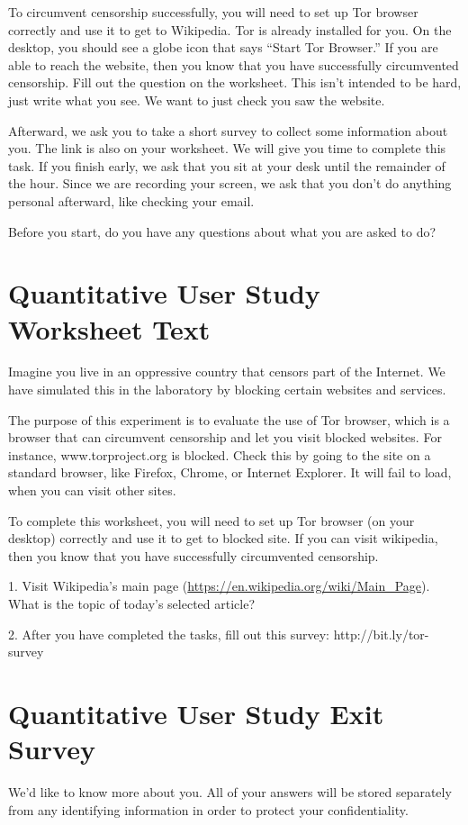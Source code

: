 \documentclass[USenglish,oneside,twocolumn]{article}
\begin{document}
To circumvent censorship successfully, you will need to set up Tor browser correctly and use it to get to Wikipedia. Tor is already installed for you. On the desktop, you should see a globe icon that says ``Start Tor Browser.'' If you are able to reach the website, then you know that you have successfully circumvented censorship. Fill out the question on the worksheet. This isn't intended to be hard, just write what you see. We want to just check you saw the website. 

Afterward, we ask you to take a short survey to collect some information about you. The link is also on your worksheet.
We will give you time to complete this task. If you finish early, we ask that you sit at your desk until the remainder of the hour. Since we are recording your screen, we ask that you don't do anything personal afterward, like checking your email.

Before you start, do you have any questions about what you are asked to do? 

\section{Quantitative User Study Worksheet Text} 
\label{summative-worksheet}
Imagine you live in an oppressive country that censors part of the Internet. We have simulated this in the laboratory by blocking certain websites and services.

The purpose of this experiment is to evaluate the use of Tor browser, which is a browser that can circumvent censorship and let you visit blocked websites. For instance, www.torproject.org is blocked. Check this by going to the site on a standard browser, like Firefox, Chrome, or Internet Explorer. It will fail to load, when you can visit other sites.

To complete this worksheet, you will need to set up Tor browser (on your desktop) correctly and use it to get to blocked site. If you can visit wikipedia, then you know that you have successfully circumvented censorship.

1. Visit Wikipedia’s main page (\url{https://en.wikipedia.org/wiki/Main\_Page}). What is the topic of today’s selected article? 

2. After you have completed the tasks, fill out this survey: http://bit.ly/tor-survey 


\section{Quantitative User Study Exit Survey} 
\label{quantitative-exit-survey}
We'd like to know more about you.  All of your answers will be stored separately from any identifying information in order to protect your confidentiality.
\end{document}

